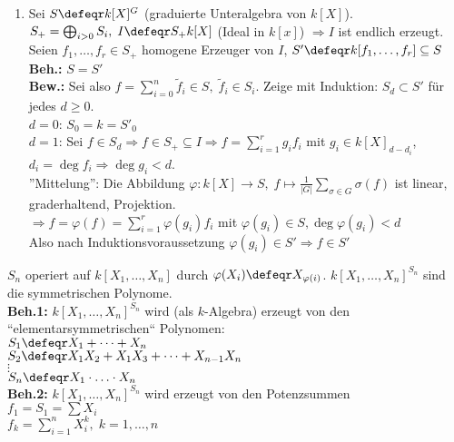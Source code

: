 \begin{Bew}
  \begin{enumerate}
    \item 
      Sei $S \defeqr k[X]^G$ (graduierte Unteralgebra von $k[X]$).\\
      $S_+ = \bigoplus_{i > 0} S_i, \; I \defeqr S_+ k[X]$ (Ideal in $k[x]$) 
      $\Rightarrow I$ ist endlich erzeugt.\\
      Seien $f_1, \dots, f_r \in S_+$ homogene Erzeuger von $I$, $S' \defeqr k[f_1,
      \dots, f_r] \subseteq S$\\
      \textbf{Beh.:} $S=S'$\\
      \textbf{Bew.:} Sei also $f = \sum_{i=0}^n \tilde{f}_i \in S, \; \tilde{f}_i
      \in S_i$. Zeige mit Induktion: $S_d \subset S'$ für jedes $d \ge 0$.\\
      $d = 0$: $S_0 = k = S'_0$\\
      $d = 1$: Sei $f \in S_d \Rightarrow f \in S_+ \subseteq I \Rightarrow f =
      \sum_{i=1}^r g_i f_i$ mit $g_i \in k[X]_{d- d_i}$, $d_i = \deg{f_i}
      \Rightarrow \deg{g_i} < d$.\\
      ''Mittelung'': Die Abbildung $\varphi: k[X] \to S, \; f \mapsto
      \frac{1}{|G|} \sum_{\sigma \in G} \sigma(f)$ ist linear, graderhaltend,
      Projektion.\\
      $\Rightarrow f = \varphi(f) = \sum_{i=1}^r \varphi(g_i) f_i$ mit
      $\varphi(g_i) \in S,\deg{\varphi(g_i)}<d$\\
      Also nach Induktionsvoraussetzung $\varphi(g_i) \in S' \Rightarrow f \in
      S'$
  \end{enumerate}
\end{Bew}

\begin{nnBsp}
  $S_n$ operiert auf $k[X_1, \dots, X_n]$ durch $\varphi(X_i) \defeqr
  X_{\varphi(i)}$. $k[X_1, \dots, X_n]^{S_n}$ sind die symmetrischen Polynome.\\
  \textbf{Beh.1:} $k[X_1, \dots, X_n]^{S_n}$ wird (als $k$-Algebra) erzeugt von
  den ``elementarsymmetrischen`` Polynomen:\\ $S_1 \defeqr X_1 + \dots + X_n$\\
  $S_2 \defeqr X_1X_2 + X_1X_3 + \dots + X_{n-1}X_n$\\
  $\vdots$\\
  $S_n \defeqr X_1 \cdot \ldots \cdot X_n$\\
  \textbf{Beh.2:} $k[X_1, \dots, X_n]^{S_n}$ wird erzeugt von den Potenzsummen\\
  $f_1 = S_1 = \sum X_i$\\
  $f_k = \sum_{i=1}^n X_i^k, \; k = 1, \dots, n$
\end{nnBsp}

